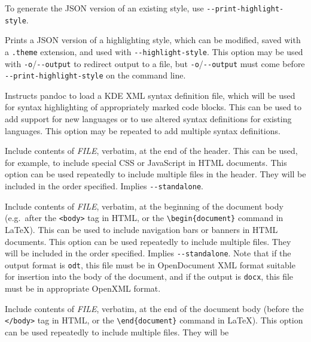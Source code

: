 \documentclass[
  b5paper
]{book}
\begin{document}
\begin{description}
To generate the JSON version of an existing style, use
\texttt{-\/-print-highlight-style}.
\item[\texttt{-\/-print-highlight-style=}\emph{STYLE}\textbar{}\emph{FILE}]
Prints a JSON version of a highlighting style, which can be modified,
saved with a \texttt{.theme} extension, and used with
\texttt{-\/-highlight-style}. This option may be used with
\texttt{-o}/\texttt{-\/-output} to redirect output to a file, but
\texttt{-o}/\texttt{-\/-output} must come before
\texttt{-\/-print-highlight-style} on the command line.
\item[\texttt{-\/-syntax-definition=}\emph{FILE}]
Instructs pandoc to load a KDE XML syntax definition file, which will be
used for syntax highlighting of appropriately marked code blocks. This
can be used to add support for new languages or to use altered syntax
definitions for existing languages. This option may be repeated to add
multiple syntax definitions.
\item[\texttt{-H} \emph{FILE},
\texttt{-\/-include-in-header=}\emph{FILE}\textbar{}\emph{URL}]
Include contents of \emph{FILE}, verbatim, at the end of the header.
This can be used, for example, to include special CSS or JavaScript in
HTML documents. This option can be used repeatedly to include multiple
files in the header. They will be included in the order specified.
Implies \texttt{-\/-standalone}.
\item[\texttt{-B} \emph{FILE},
\texttt{-\/-include-before-body=}\emph{FILE}\textbar{}\emph{URL}]
Include contents of \emph{FILE}, verbatim, at the beginning of the
document body (e.g.~after the \texttt{\textless{}body\textgreater{}} tag
in HTML, or the \texttt{\textbackslash{}begin\{document\}} command in
LaTeX). This can be used to include navigation bars or banners in HTML
documents. This option can be used repeatedly to include multiple files.
They will be included in the order specified. Implies
\texttt{-\/-standalone}. Note that if the output format is \texttt{odt},
this file must be in OpenDocument XML format suitable for insertion into
the body of the document, and if the output is \texttt{docx}, this file
must be in appropriate OpenXML format.
\item[\texttt{-A} \emph{FILE},
\texttt{-\/-include-after-body=}\emph{FILE}\textbar{}\emph{URL}]
Include contents of \emph{FILE}, verbatim, at the end of the document
body (before the \texttt{\textless{}/body\textgreater{}} tag in HTML, or
the \texttt{\textbackslash{}end\{document\}} command in LaTeX). This
option can be used repeatedly to include multiple files. They will be

\end{description}
\end{document}
